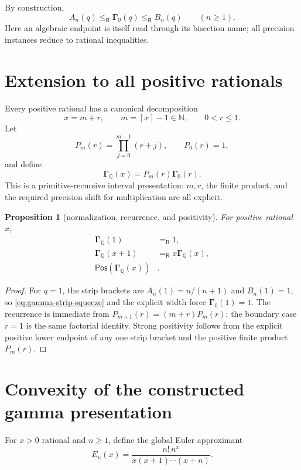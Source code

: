 \documentclass[11pt]{article}
\newtheorem{proposition}[theorem]{Proposition}
\newcommand{\N}{\mathbb N}
\newcommand{\Q}{\mathbb Q}
\newcommand{\Gam}{\boldsymbol\Gamma}
\newcommand{\Eq}{\mathrel{=_{\!\mathsf R}}}
\newcommand{\Le}{\mathrel{\le_{\!\mathsf R}}}
\newcommand{\Pos}{\mathsf{Pos}}
\newcommand{\ceil}[1]{\left\lceil #1\right\rceil}
\begin{document}
By construction,
\begin{equation}
 A_n(q)\Le\Gam_0(q)\Le B_n(q)
 \qquad(n\ge1).
 \label{eq:gamma-strip-squeeze}
\end{equation}
Here an algebraic endpoint is itself read through its bisection name; all
precision instances reduce to rational inequalities.

\section{Extension to all positive rationals}
\label{sec:extension}

Every positive rational has a canonical decomposition
\[
 x=m+r,
 \qquad m=\ceil{x}-1\in\N,
 \qquad 0<r\le1.
\]
Let
\[
 P_m(r)=\prod_{j=0}^{m-1}(r+j),\qquad P_0(r)=1,
\]
and define
\begin{equation}
 \Gam_{\Q}(x)=P_m(r)\Gam_0(r).
 \label{eq:global-gamma}
\end{equation}
This is a primitive-recursive interval presentation: $m,r$, the finite
product, and the required precision shift for multiplication are all explicit.

\begin{proposition}[normalization, recurrence, and positivity]
For positive rational $x$,
\begin{align*}
 \Gam_{\Q}(1)&\Eq1,\\
 \Gam_{\Q}(x+1)&\Eq x\Gam_{\Q}(x),\\
 \Pos(\Gam_{\Q}(x))&.
\end{align*}
\end{proposition}

\begin{proof}
For $q=1$, the strip brackets are
$A_n(1)=n/(n+1)$ and $B_n(1)=1$, so
\eqref{eq:gamma-strip-squeeze} and the explicit width force
$\Gam_0(1)=1$.  The recurrence is immediate from
$P_{m+1}(r)=(m+r)P_m(r)$; the boundary case $r=1$ is the same factorial
identity.  Strong positivity follows from the explicit positive lower
endpoint of any one strip bracket and the positive finite product $P_m(r)$.
\end{proof}

\section{Convexity of the constructed gamma presentation}
\label{sec:gamma-convexity}

For $x>0$ rational and $n\ge1$, define the global Euler approximant
\begin{equation}
 E_n(x)=\frac{n!\,n^x}{x(x+1)\cdots(x+n)}.
 \label{eq:En}
\end{equation}
\end{document}
